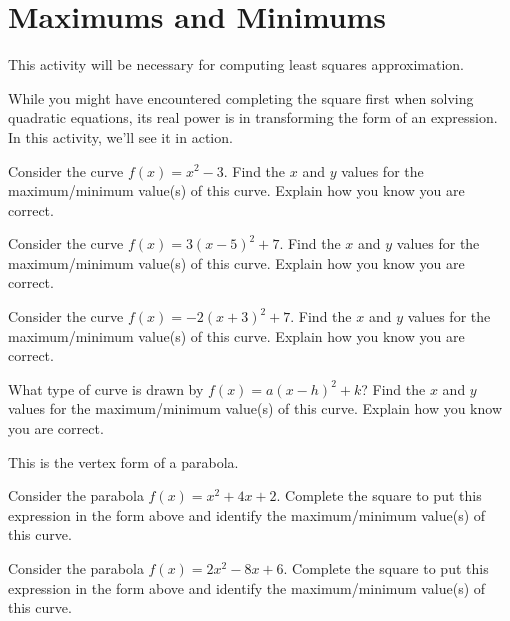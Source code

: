 \newpage
\section{Maximums and Minimums}\label{A:vertex}

\begin{teachingnote}
This activity will be necessary for computing least squares
approximation.
\end{teachingnote}


While you might have encountered completing the
square first when solving quadratic
equations, its real power is in transforming the form of an
expression. In this activity, we'll see it in action. 

\begin{prob}
Consider the curve $f(x) = x^2 -3$. Find the $x$ and $y$ values for
the maximum/minimum value(s) of this curve. Explain how you know you
are correct.
\end{prob}

\begin{prob}
Consider the curve $f(x) = 3(x-5)^2 +7$. Find the $x$ and $y$ values for
the maximum/minimum value(s) of this curve. Explain how you know you
are correct.
\end{prob}



\begin{prob}
Consider the curve $f(x) = -2(x+3)^2 + 7$. Find the $x$ and $y$ values for
the maximum/minimum value(s) of this curve. Explain how you know you
are correct.
\end{prob}

\begin{prob}
What type of curve is drawn by $f(x) = a(x-h)^2+k$? Find the $x$ and
$y$ values for the maximum/minimum value(s) of this curve. Explain how
you know you are correct.
\end{prob}

\begin{teachingnote}
This is the vertex form of a parabola.
\end{teachingnote}


\begin{prob}
Consider the parabola $f(x) = x^2 + 4x + 2$. Complete the square to
put this expression in the form above and identify the maximum/minimum
value(s) of this curve.
\end{prob}


\begin{prob}
Consider the parabola $f(x) = 2x^2 - 8x + 6$. Complete the square to
put this expression in the form above and identify the maximum/minimum
value(s) of this curve.
\end{prob}

